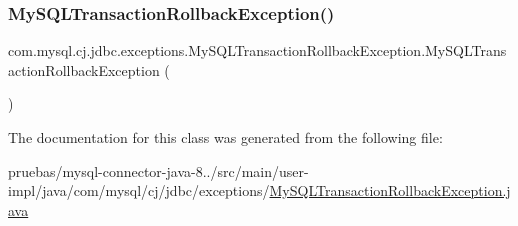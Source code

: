 \subsubsection{\texorpdfstring{My\+S\+Q\+L\+Transaction\+Rollback\+Exception()}{MySQLTransactionRollbackException()}\hspace{0.1cm}{\footnotesize\ttfamily [4/4]}}
{\footnotesize\ttfamily com.\+mysql.\+cj.\+jdbc.\+exceptions.\+My\+S\+Q\+L\+Transaction\+Rollback\+Exception.\+My\+S\+Q\+L\+Transaction\+Rollback\+Exception (\begin{DoxyParamCaption}{ }\end{DoxyParamCaption})}



The documentation for this class was generated from the following file\+:\begin{DoxyCompactItemize}
\item 
pruebas/mysql-\/connector-\/java-\/8../src/main/user-\/impl/java/com/mysql/cj/jdbc/exceptions/\mbox{\hyperlink{_my_s_q_l_transaction_rollback_exception_8java}{My\+S\+Q\+L\+Transaction\+Rollback\+Exception.\+java}}\end{DoxyCompactItemize}
